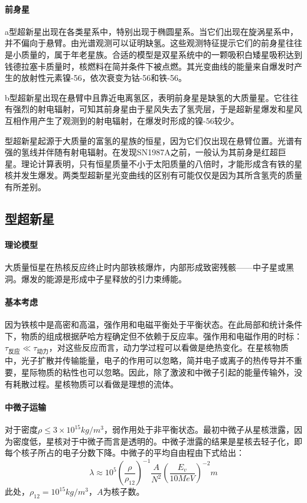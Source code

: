 \paragraph{前身星}
a型超新星出现在各类星系中，特别出现于椭圆星系。当它们出现在旋涡星系中，并不偏向于悬臂。由光谱观测可以证明缺氢。这些观测特征提示它们的前身星往往是小质量的，属于年老星族。合适的模型是双星系统中的一颗吸积白矮星吸积达到钱德拉塞卡质量时，核燃料在简并条件下被点燃。其光变曲线的能量来自爆发时产生的放射性元素镍-56，依次衰变为钴-56和铁-56。

b型超新星出现在悬臂中且靠近电离氢区，表明前身星是缺氢的大质量星。它往往有强烈的射电辐射，可知其前身星由于星风失去了氢壳层，于是超新星爆发和星风互相作用产生了观测到的射电辐射，在爆发时形成的镍-56较少。

型超新星起源于大质量的富氢的星族的恒星，因为它们仅出现在悬臂位置。光谱有强的氢线并伴随有射电辐射。在发现SN1987A之前，一般认为其前身是红超巨星。理论计算表明，只有恒星质量不小于太阳质量的八倍时，才能形成含有铁的星核并发生爆发。两类型超新星光变曲线的区别有可能仅仅是因为其所含氢壳的质量有所差别。
\subsection{型超新星}
\paragraph{理论模型}大质量恒星在热核反应终止时内部铁核爆炸，内部形成致密残骸——中子星或黑洞。爆发的能源是形成中子星释放的引力束缚能。
\paragraph{基本考虑}因为铁核中是高密和高温，强作用和电磁平衡处于平衡状态。在此局部和统计条件下，物质的组成根据萨哈方程确定但不依赖于反应率。强作用和电磁作用的时标：$\tau_{\mbox{反应}}\ll \tau_{\mbox{动力}}$，对这些反应而言，动力学过程可以看做是绝热变化。在星核物质中，光子扩散并传输能量，电子的作用可以忽略，简并电子或离子的热传导并不重要，星际物质的粘性也可以忽略。因此，除了激波和中微子引起的能量传输外，没有耗散过程。星核物质可以看做是理想的流体。
\paragraph{中微子运输}对于密度$\rho\leq 3\times 10^{15}kg/m^3$，弱作用处于非平衡状态。最初中微子从星核泄露，因为密度低，星核对于中微子而言是透明的。中微子泄露的结果是星核去轻子化，即每个核子所占的电子分数下降。中微子的平均自由程由下式给出：
\begin{equation}
	\lambda \approx 10^5\left(\frac{\rho}{\rho_{12}}\right)^{-1}\frac{A}{N^2}\left(\frac{E_{v}}{10 MeV}\right)^{-2}m
\end{equation}
此处，$\rho_{12}=10^{15}kg/m^3$，$A$为核子数。

